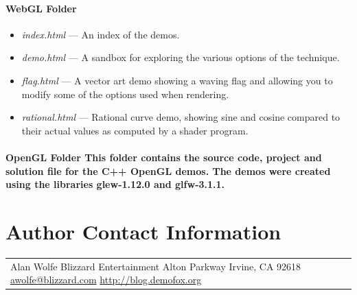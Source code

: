 \documentclass{jcgt}
\begin{document}
\paragraph{\textbf{WebGL Folder}}
\begin{itemize}
  \item \textit{index.html} --- An index of the demos.
  \item \textit{demo.html} --- A sandbox for exploring the various options of the technique.
  \item \textit{flag.html} --- A vector art demo showing a waving flag and allowing you to modify some of the options used when rendering.
  \item \textit{rational.html} --- Rational curve demo, showing sine and cosine compared to their actual values as computed by a shader program.
\end{itemize}

\paragraph{
\textbf{OpenGL Folder}
\newline
This folder contains the source code, project and solution file for the C++ OpenGL demos.  The demos were created using the libraries glew-1.12.0 and glfw-3.1.1.
}

\section*{Author Contact Information}

\hspace{-2mm}\begin{tabular}{p{}p{}}
Alan Wolfe \newline
Blizzard Entertainment \newline
16215 Alton Parkway \newline
Irvine, CA 92618 \newline
\href{mailto:awolfe@blizzard.com}{awolfe@blizzard.com}
\href{http://blog.demofox.org}{http://blog.demofox.org}
\end{tabular}


\afterdoc
\end{document}
